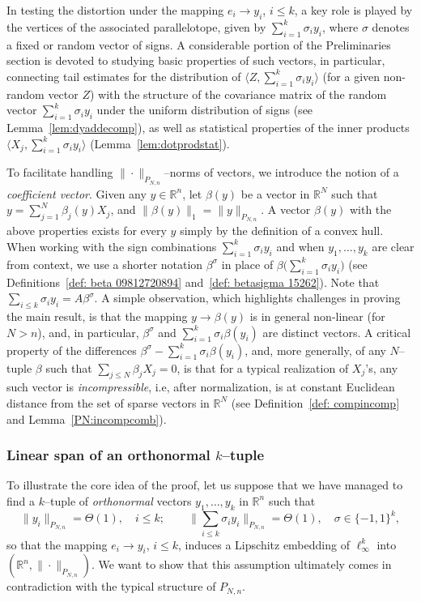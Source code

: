 \documentclass[11pt]{amsart}
\theoremstyle{definition}
\theoremstyle{plain}
\newcommand{\R}{\mathbb{R}}
\def\R{{\mathbb R}}
\begin{document}
In testing the distortion under the mapping $e_i\to y_i$, $i\leq k$,
a key role is played by the vertices of the associated parallelotope, given by
$\sum_{i=1}^k \sigma_i y_i$, where $\sigma$ denotes a fixed or random vector of signs.
A considerable portion of the Preliminaries section is devoted to studying
basic properties of such vectors, in particular, connecting tail estimates for
the distribution of $\langle Z,\sum_{i=1}^k \sigma_i y_i\rangle$ (for a given non-random vector $Z$)
with the structure of the covariance matrix of the random vector $\sum_{i=1}^k \sigma_i y_i$
under the uniform distribution of signs (see Lemma~\ref{lem:dyaddecomp}),
as well as statistical properties of the inner products $\langle X_j,\sum_{i=1}^k \sigma_i y_i\rangle$ (Lemma~\ref{lem:dotprodstat}).

To facilitate handling $\|\cdot\|_{P_{N,n}}$--norms of vectors, we introduce the notion
of a {\it coefficient vector}. Given any $y\in\R^n$, let $\beta(y)$ be a vector in $\R^N$
such that $y=\sum_{j=1}^N \beta_j(y) X_j$, and $\|\beta(y)\|_1=\|y\|_{P_{N,n}}$.
A vector $\beta(y)$ with the above properties exists for every $y$
simply by the definition of a convex hull.
When working with the sign combinations $\sum_{i=1}^k \sigma_i y_i$
and when $y_1,\dots,y_k$ are clear from context, we use a shorter notation $\beta^\sigma$
in place of $\beta\big(\sum_{i=1}^k \sigma_i y_i\big)$
(see Definitions~\ref{def: beta 09812720894} and~\ref{def: betasigma 15262}).
Note that $\sum_{i\leq k} \sigma_i y_i = A\beta^\sigma$.
A simple observation, which highlights challenges
in proving the main result, is that the mapping $y\to\beta(y)$
is in general non-linear (for $N>n$), and, in particular,
$\beta^\sigma$ and $\sum_{i=1}^k \sigma_i \beta(y_i)$ are distinct vectors.
A critical property of the differences $\beta^\sigma-\sum_{i=1}^k \sigma_i \beta(y_i)$,
and, more generally, of any $N$--tuple $\beta$ such that
$\sum_{j\leq N}\beta_j X_j=0$, is that
for a typical realization of $X_j$'s,
any such vector is {\it incompressible},
i.e, after normalization, is at constant
Euclidean distance from the set of sparse vectors in $\R^N$
(see Definition~\ref{def: compincomp} and Lemma~\ref{PN:incompcomb}).

\subsubsection{Linear span of an orthonormal $k$--tuple}
To illustrate the core idea of the proof, 
let us suppose that we have managed to find
a $k$--tuple of {\it orthonormal} vectors $y_1,\dots,y_k$ in $\R^n$ such that
$$\|y_i\|_{P_{N,n}}=  \Theta(1), \quad i\leq k; \qquad
\Big\|\sum_{i\leq k} \sigma_i y_i\Big\|_{P_{N,n}}=\Theta(1), \quad \sigma\in\{-1,1\}^k,$$
so that the mapping $e_i\longrightarrow y_i$, $i\leq k$,
induces a Lipschitz embedding of $\ell_\infty^k$ into $(\R^n,\|\cdot\|_{P_{N,n}})$.
We want to show that this assumption ultimately comes in contradiction with
the typical structure of $P_{N,n}$.
\end{document}
